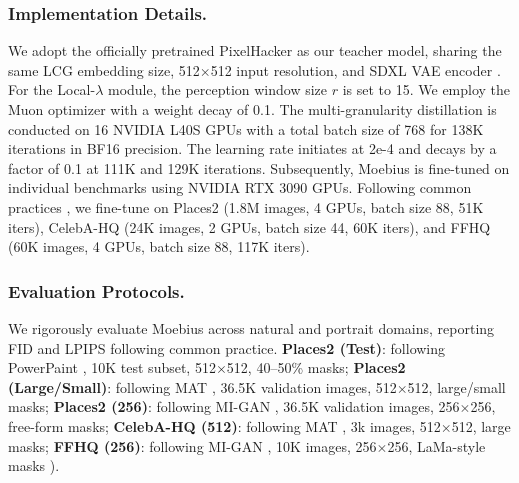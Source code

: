 \documentclass{llmxive}
\begin{document}
\subsubsection{Implementation Details.}\label{subsubsec:impl}
We adopt the officially pretrained PixelHacker \cite{xu2025pixelhacker} as our teacher model, sharing the same LCG embedding size, 512$\times$512 input resolution, and SDXL VAE encoder \cite{podell2023sdxl}. For the Local-$\lambda$ module, the perception window size $r$ is set to 15. We employ the Muon optimizer \cite{jordan2024muon, kimiteam2025kimik2} with a weight decay of 0.1. 
The multi-granularity distillation is conducted on 16 NVIDIA L40S GPUs with a total batch size of 768 for 138K iterations in BF16 precision. The learning rate initiates at 2e-4 and decays by a factor of 0.1 at 111K and 129K iterations. Subsequently, Moebius is fine-tuned on individual benchmarks using NVIDIA RTX 3090 GPUs. Following common practices \cite{suvorov2021lama, Sargsyan2023migan, li2022mat}, we fine-tune on Places2 \cite{zhou2017places} (1.8M images, 4 GPUs, batch size 88, 51K iters), CelebA-HQ \cite{karras2018celebahq} (24K images, 2 GPUs, batch size 44, 60K iters), and FFHQ \cite{karras2018stylegan_ffhq} (60K images, 4 GPUs, batch size 88, 117K iters). 

\vspace{-1em}
\vspace{-0.4em}
\subsubsection{Evaluation Protocols.}\label{subsubsec:compare_details}
We rigorously evaluate Moebius across natural \cite{zhou2017places} and portrait \cite{karras2018stylegan_ffhq, karras2018celebahq} domains, reporting FID \cite{huesel2017FID} and LPIPS \cite{zhang2018lpips} following common practice.
\textbf{Places2 (Test)}: following PowerPaint \cite{zhuang2023powerpaint}, 10K test subset, 512$\times$512, 40–50\% masks;
\textbf{Places2 (Large/Small)}: following MAT \cite{li2022mat}, 36.5K validation images, 512$\times$512, large/small masks;
\textbf{Places2 (256)}: following MI-GAN \cite{Sargsyan2023migan}, 36.5K validation images, 256$\times$256, free-form masks;
\textbf{CelebA-HQ (512)}: following MAT \cite{li2022mat}, 3k images, 512$\times$512, large masks;
\textbf{FFHQ (256)}: following MI-GAN \cite{Sargsyan2023migan}, 10K images, 256$\times$256, LaMa-style masks \cite{suvorov2021lama}). 


\vspace{-1em}
\vspace{-0.4em}
\end{document}
